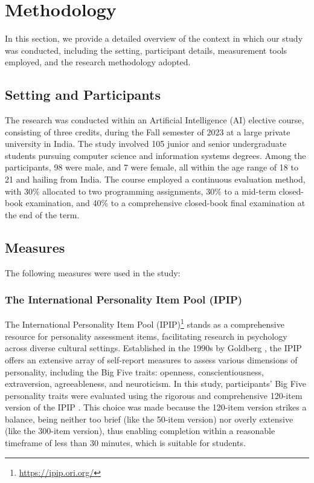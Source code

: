 \section{Methodology} \label{sec:method}

In this section, we provide a detailed overview of the context in which our study was conducted, including the setting, participant details, measurement tools employed, and the research methodology adopted.

\subsection{Setting and Participants}
The research was conducted within an Artificial Intelligence (AI) elective course, consisting of three credits, during the Fall semester of 2023 at a large private university in India. The study involved 105 junior and senior undergraduate students pursuing computer science and information systems degrees. Among the participants, 98 were male, and 7 were female, all within the age range of 18 to 21 and hailing from India. The course employed a continuous evaluation method, with 30\% allocated to two programming assignments, 30\% to a mid-term closed-book examination, and 40\% to a comprehensive closed-book final examination at the end of the term.

\subsection{Measures}
The following measures were used in the study:
\subsubsection{The International Personality Item Pool (IPIP)}
The International Personality Item Pool (IPIP)\footnote{\url{https://ipip.ori.org/}} stands as a comprehensive resource for personality assessment items, facilitating research in psychology across diverse cultural settings. Established in the 1990s by Goldberg \cite{Goldberg}, the IPIP offers an extensive array of self-report measures to assess various dimensions of personality, including the Big Five traits: openness, conscientiousness, extraversion, agreeableness, and neuroticism. In this study, participants' Big Five personality traits were evaluated using the rigorous and comprehensive 120-item version of the IPIP \cite{JOHNSON201478}. This choice was made because the 120-item version strikes a balance, being neither too brief (like the 50-item version) nor overly extensive (like the 300-item version), thus enabling completion within a reasonable timeframe of less than 30 minutes, which is suitable for students.

